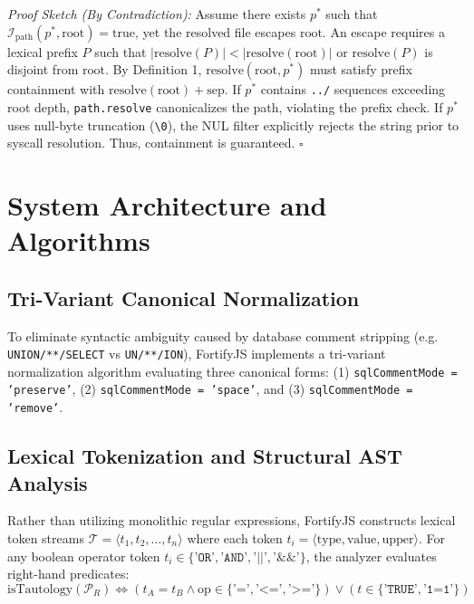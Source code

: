 \documentclass[conference]{IEEEtran}
\begin{document}
\textit{Proof Sketch (By Contradiction):} Assume there exists $p^*$ such that $\mathcal{I}_{\text{path}}(p^*, \text{root}) = \text{true}$, yet the resolved file escapes $\text{root}$. An escape requires a lexical prefix $P$ such that $|\text{resolve}(P)| < |\text{resolve}(\text{root})|$ or $\text{resolve}(P)$ is disjoint from $\text{root}$. By Definition 1, $\text{resolve}(\text{root}, p^*)$ must satisfy prefix containment with $\text{resolve}(\text{root}) + \text{sep}$. If $p^*$ contains \texttt{../} sequences exceeding root depth, \texttt{path.resolve} canonicalizes the path, violating the prefix check. If $p^*$ uses null-byte truncation (\texttt{\textbackslash 0}), the NUL filter explicitly rejects the string prior to syscall resolution. Thus, containment is guaranteed. $\square$

\section{System Architecture and Algorithms}

\subsection{Tri-Variant Canonical Normalization}
To eliminate syntactic ambiguity caused by database comment stripping (e.g. \texttt{UNION/**/SELECT} vs \texttt{UN/**/ION}), FortifyJS implements a tri-variant normalization algorithm evaluating three canonical forms: (1) \texttt{sqlCommentMode = 'preserve'}, (2) \texttt{sqlCommentMode = 'space'}, and (3) \texttt{sqlCommentMode = 'remove'}.

\subsection{Lexical Tokenization and Structural AST Analysis}
Rather than utilizing monolithic regular expressions, FortifyJS constructs lexical token streams $\mathcal{T} = \langle t_1, t_2, \dots, t_n \rangle$ where each token $t_i = \langle \text{type}, \text{value}, \text{upper} \rangle$. For any boolean operator token $t_i \in \{\texttt{'OR'}, \texttt{'AND'}, \texttt{'||'}, \texttt{'\&\&'}\}$, the analyzer evaluates right-hand predicates:
\begin{equation}
\text{isTautology}(\mathcal{P}_R) \iff \left( t_A = t_B \land \text{op} \in \{\texttt{'='}, \texttt{'<='}, \texttt{'>='}\} \right) \lor \left( t \in \{\texttt{'TRUE'}, \texttt{'1=1'}\} \right)
\end{equation}
\end{document}
